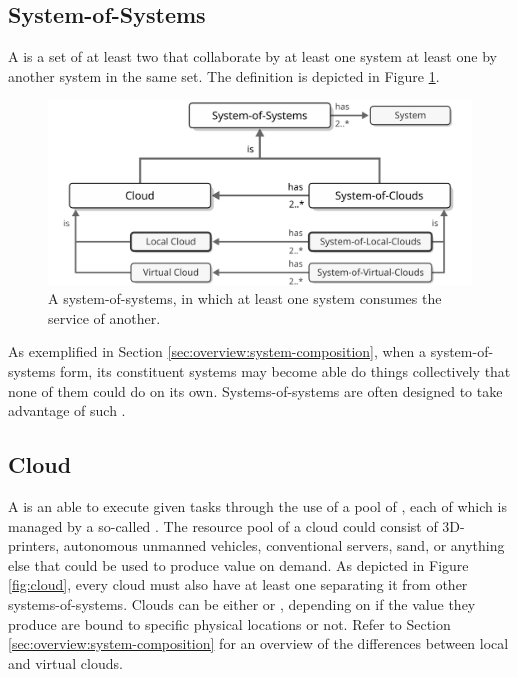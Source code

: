 \newpage

\subsection{System-of-Systems}
\label{sec:concepts:sos}

A  is a set of at least two  that collaborate by at least one system  at least one   by another system in the same set.
The definition is depicted in Figure \ref{fig:system-of-systems}.

\begin{figure}[ht!]
  \centering
  \includegraphics[scale=0.9]{figures/system-of-systems}
  \caption{
    A system-of-systems, in which at least one system consumes the service of another.
  }
  \label{fig:system-of-systems}
\end{figure}

As exemplified in Section \ref{sec:overview:system-composition}, when a system-of-systems form, its constituent systems may become able do things collectively that none of them could do on its own.
Systems-of-systems are often designed to take advantage of such .

\subsection{Cloud}
\label{sec:concepts:cloud}

A  is an   able to execute given tasks through the use of a pool of , each of which is managed by a so-called .
The resource pool of a cloud could consist of 3D-printers, autonomous unmanned vehicles, conventional servers, sand, or anything else that could be used to produce value on demand.
As depicted in Figure \ref{fig:cloud}, every cloud must also have at least one  separating it from other systems-of-systems.
Clouds can be either  or , depending on if the value they produce are bound to specific physical locations or not.
Refer to Section \ref{sec:overview:system-composition} for an overview of the differences between local and virtual clouds.

